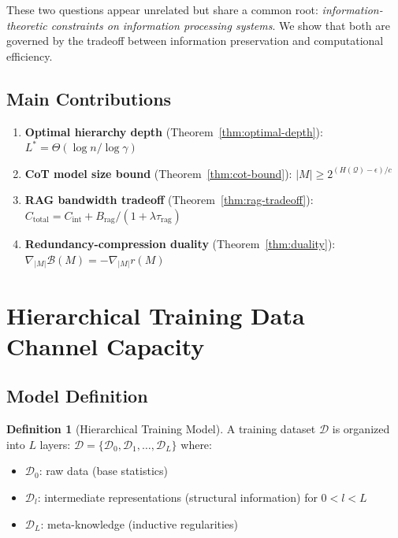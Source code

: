 \documentclass[12pt]{article}
\theoremstyle{definition}
\newtheorem{definition}{Definition}[section]
\theoremstyle{remark}
\begin{document}
These two questions appear unrelated but share a common root: \emph{information-theoretic constraints on information processing systems}. We show that both are governed by the tradeoff between information preservation and computational efficiency.

\subsection{Main Contributions}

\begin{enumerate}
  \item \textbf{Optimal hierarchy depth} (Theorem~\ref{thm:optimal-depth}): $L^* = \Theta(\log n / \log \gamma)$
  \item \textbf{CoT model size bound} (Theorem~\ref{thm:cot-bound}): $|M| \geq 2^{(H(\mathcal{Q}) - \epsilon)/c}$
  \item \textbf{RAG bandwidth tradeoff} (Theorem~\ref{thm:rag-tradeoff}): $C_{\mathrm{total}} = C_{\mathrm{int}} + B_{\mathrm{rag}} / (1 + \lambda \tau_{\mathrm{rag}})$
  \item \textbf{Redundancy-compression duality} (Theorem~\ref{thm:duality}): $\nabla_{|M|} \mathcal{B}(M) = -\nabla_{|M|} r(M)$
\end{enumerate}

\section{Hierarchical Training Data Channel Capacity}

\subsection{Model Definition}

\begin{definition}[Hierarchical Training Model]\label{def:hierarchy}
A training dataset $\mathcal{D}$ is organized into $L$ layers: $\mathcal{D} = \{\mathcal{D}_0, \mathcal{D}_1, \ldots, \mathcal{D}_L\}$ where:
\begin{itemize}
  \item $\mathcal{D}_0$: raw data (base statistics)
  \item $\mathcal{D}_l$: intermediate representations (structural information) for $0 < l < L$
  \item $\mathcal{D}_L$: meta-knowledge (inductive regularities)
\end{itemize}
\end{definition}
\end{document}
